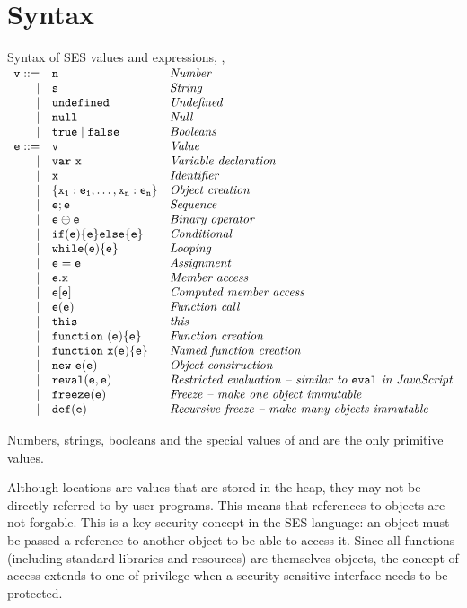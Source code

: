 \documentclass[a4paper,notitlepage]{report}
\begin{document}
  \section{Syntax}
  \label{sec:syntax}
  \newcommand{\syntaxline}[3][\pipe]{#1 & \js{#2} & \textit{#3}\\}
    \begin{display}{Syntax of SES values and expressions, , }
      $\begin{array}{rll}
        \syntaxline[\js{v} ::=]{n}{Number}
        \syntaxline{s}{String}
        \syntaxline{\und}{Undefined}
        \syntaxline{\nil}{Null}
        \syntaxline{\true \pipe \false}{Booleans}
        \syntaxline[\js{e} ::=]{v}{Value}
        \syntaxline{\jsvar{x}}{Variable declaration}
        \syntaxline{x}{Identifier}
        \syntaxline{\{x_1:e_1, \ldots, x_n:e_n\}}{Object creation}
        \syntaxline{e; e}{Sequence}
        \syntaxline{e \oplus e}{Binary operator}
        \syntaxline{if(e) \{e\} else \{e\}}{Conditional}
        \syntaxline{while(e) \{e\}}{Looping}
        \syntaxline{e = e}{Assignment}
        \syntaxline{e.x}{Member access}
        \syntaxline{e[e]}{Computed member access}
        \syntaxline{e(e)}{Function call}
        \syntaxline{this}{this}
        \syntaxline{\jsfun{e}{e}}{Function creation}
        \syntaxline{\jsfun[x]{e}{e}}{Named function creation}
        \syntaxline{\jsnew{e}{e}}{Object construction}
        \syntaxline{reval(e, e)}{Restricted evaluation -- similar to \js{eval} in JavaScript}
        \syntaxline{freeze(e)}{Freeze -- make one object immutable}
        \syntaxline{def(e)}{Recursive freeze -- make many objects immutable}
      \end{array}$
    \end{display}

  Numbers, strings, booleans and the special values of \und and \nil are the
  only primitive values.

  Although locations are values that are stored in the heap, they
  may not be directly referred to by user programs. This means that
  references to objects are not forgable. This is a key security concept in the
  SES language: an object must be passed a reference to another object to be
  able to access it.
  Since all functions (including standard libraries and resources) are
  themselves objects, the concept of access extends to one of privilege when a
  security-sensitive interface needs to be protected.
\end{document}
